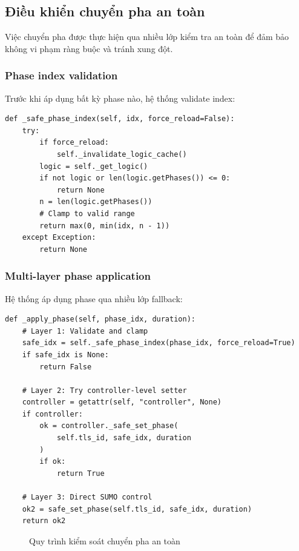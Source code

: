 \subsection{Điều khiển chuyển pha an toàn}

Việc chuyển pha được thực hiện qua nhiều lớp kiểm tra an toàn để đảm bảo không vi phạm ràng buộc và tránh xung đột.

\subsubsection{Phase index validation}

Trước khi áp dụng bất kỳ phase nào, hệ thống validate index:

\begin{lstlisting}[style=py, caption={Safe phase index clamping}]
def _safe_phase_index(self, idx, force_reload=False):
    try:
        if force_reload:
            self._invalidate_logic_cache()
        logic = self._get_logic()
        if not logic or len(logic.getPhases()) <= 0:
            return None
        n = len(logic.getPhases())
        # Clamp to valid range
        return max(0, min(idx, n - 1))
    except Exception:
        return None
\end{lstlisting}

\subsubsection{Multi-layer phase application}

Hệ thống áp dụng phase qua nhiều lớp fallback:

\begin{lstlisting}[style=py, caption={Hierarchical phase application}]
def _apply_phase(self, phase_idx, duration):
    # Layer 1: Validate and clamp
    safe_idx = self._safe_phase_index(phase_idx, force_reload=True)
    if safe_idx is None:
        return False
    
    # Layer 2: Try controller-level setter
    controller = getattr(self, "controller", None)
    if controller:
        ok = controller._safe_set_phase(
            self.tls_id, safe_idx, duration
        )
        if ok:
            return True
    
    # Layer 3: Direct SUMO control
    ok2 = safe_set_phase(self.tls_id, safe_idx, duration)
    return ok2
\end{lstlisting}

\begin{figure}[H]
    \centering
    \caption{Quy trình kiểm soát chuyển pha an toàn}
    \label{fig:safe_phase_control}
\end{figure}

